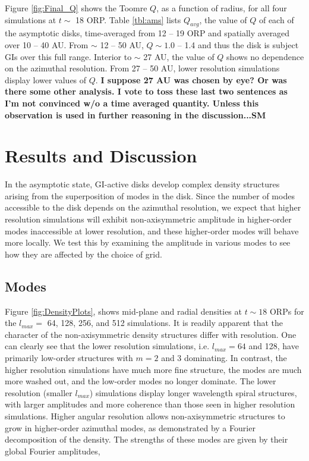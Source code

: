 \documentclass[manuscript]{aastex}
\begin{document}
Figure \ref{fig:Final_Q} shows the Toomre $Q$, as a function of radius, for all four simulations at $t \sim$ 18 ORP.  Table \ref{tbl:ams} lists $Q_{avg}$, the value of $Q$ of each of the asymptotic disks, time-averaged from 12 -- 19 ORP and spatially averaged over 10 -- 40 AU.  From $\sim$ 12 -- 50 AU, $Q \sim 1.0$ -- 1.4 and thus the disk is subject GIs over this full range.  Interior to $\sim$ 27 AU, the value of $Q$ shows no dependence on
the azimuthal resolution.  From 27 -- 50 AU, lower resolution simulations display lower values of $Q$. {\bf I suppose 27 AU was chosen by eye? Or was there some other analysis. I vote to toss these last two sentences as I'm not convinced w/o a time averaged quantity. Unless this observation is used in further reasoning in the discussion...SM} 



\section{Results and Discussion}
	
In the asymptotic state, GI-active disks develop complex density structures arising from the superposition of
modes in the disk.  Since the number of modes accessible to the disk depends on the azimuthal resolution, we expect that higher resolution simulations will exhibit non-axisymmetric amplitude in higher-order modes inaccessible at lower resolution, and these higher-order modes will 
behave more locally. We test this by examining the amplitude in various modes to see how they are affected by the choice of grid.

\subsection{Modes}
	
Figure \ref{fig:DensityPlots}, shows mid-plane and radial densities  at $t \sim 18$ ORPs for the $l_{max} =$ 64, 128, 256, and 512 simulations. It is readily apparent that the character of the non-axisymmetric density structures differ with 
resolution. One can clearly see that the lower resolution simulations, i.e. $l_{max} = 64$ and 128, have primarily low-order structures with $m = 2$ and 3 dominating. In contrast, the higher resolution simulations have much more fine structure, the modes are much more washed out, and the low-order modes no longer dominate.
The lower resolution (smaller $l_{max}$) simulations display longer wavelength spiral structures, with larger amplitudes and more coherence than those seen in higher resolution simulations. Higher angular resolution allows non-axisymmetric structures to grow in higher-order azimuthal modes, as demonstrated by a Fourier decomposition of the density. The strengths of these modes are given by their global Fourier amplitudes,
\end{document}
